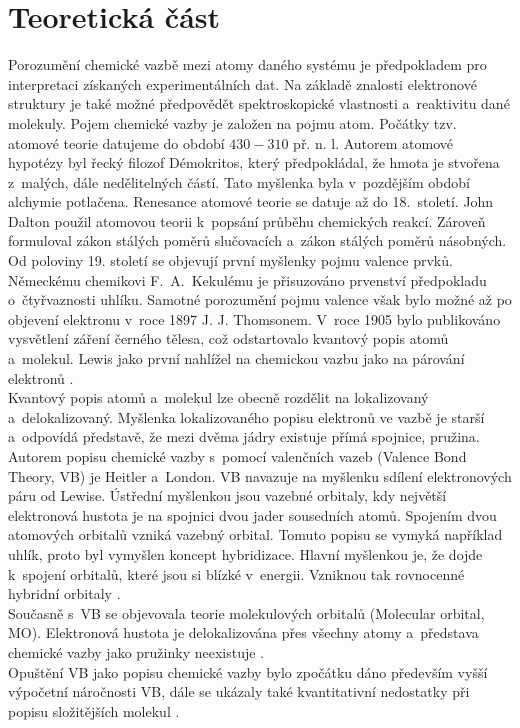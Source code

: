 \documentclass[
  printed, %
  table,   %
  lof,     %
  lot,     %
  oneside,
]{fithesis3}
\begin{document}
\chapter{Teoretická část}
Porozumění chemické vazbě mezi atomy daného systému je předpokladem pro interpretaci získaných experimentálních dat. Na základě znalosti elektronové struktury je také možné předpovědět spektroskopické vlastnosti a~reaktivitu dané molekuly. Pojem chemické vazby je založen na pojmu atom. Počátky tzv. atomové teorie datujeme do období $430-310$ př. n. l. Autorem atomové hypotézy byl řecký filozof Démokritos, který předpokládal, že hmota je stvořena z~malých, dále nedělitelných částí. Tato myšlenka byla v~pozdějším období alchymie potlačena. Renesance atomové teorie se datuje až do 18.~století. John Dalton použil atomovou teorii k~popsání průběhu chemických reakcí. Zároveň formuloval zákon stálých poměrů slučovacích a~zákon stálých poměrů násobných. Od poloviny 19. století se objevují první myšlenky pojmu valence prvků. Německému chemikovi F.~A.~Kekulému je přisuzováno prvenství předpokladu o~čtyřvaznosti uhlíku. Samotné porozumění pojmu valence však bylo možné až po objevení elektronu v~roce 1897 J. J. Thomsonem. V~roce 1905 bylo publikováno vysvětlení záření černého tělesa, což odstartovalo kvantový popis atomů a~molekul. Lewis jako první nahlížel na chemickou vazbu jako na párování elektronů \cite{Munzarova1996thesis}. \\
Kvantový popis atomů a~molekul lze obecně rozdělit na lokalizovaný a~delokalizovaný. Myšlenka lokalizovaného popisu elektronů ve vazbě je starší a~odpovídá představě, že mezi dvěma jádry existuje přímá spojnice, pružina. Autorem popisu chemické vazby s~pomocí valenčních vazeb (Valence Bond Theory, VB) je Heitler a~London. VB navazuje na myšlenku sdílení elektronových páru od Lewise. Ústřední myšlenkou jsou vazebné orbitaly, kdy největší elektronová hustota je na spojnici dvou jader sousedních atomů. Spojením dvou atomových orbitalů vzniká vazebný orbital. Tomuto popisu se vymyká například uhlík, proto byl vymyšlen koncept hybridizace. Hlavní myšlenkou je, že dojde k~spojení orbitalů, které jsou si blízké v~energii. Vzniknou tak rovnocenné hybridní orbitaly \cite{Munzarova1996thesis}. \\
Současně s~VB se objevovala teorie molekulových orbitalů (Molecular orbital, MO). Elektronová hustota je delokalizována přes všechny atomy a~představa chemické vazby jako pružinky neexistuje \cite{Munzarova1996thesis}. \\
Opuštění VB jako popisu chemické vazby bylo zpočátku dáno především vyšší výpočetní náročnosti VB, dále se ukázaly také kvantitativní nedostatky při popisu složitějších molekul \cite{lowe2011quantum}.
\end{document}
